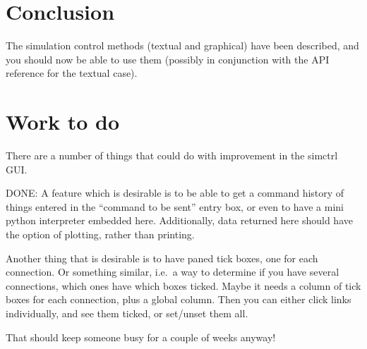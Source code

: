 \documentclass{article}
\begin{document}
\section{Conclusion}
The simulation control methods (textual and graphical) have been
described, and you should now be able to use them (possibly in
conjunction with the API reference for the textual case).

\section{Work to do}
There are a number of things that could do with improvement in the
simctrl GUI.

DONE: A feature which is desirable is to be able to get a command history of
things entered in the ``command to be sent'' entry box, or even to
have a mini python interpreter embedded here.  Additionally, data
returned here should have the option of plotting, rather than
printing.

Another thing that is desirable is to have paned tick boxes, one for
each connection.  Or something similar, i.e.\ a way to determine if
you have several connections, which ones have which boxes ticked.
Maybe it needs a column of tick boxes for each connection, plus a
global column.  Then you can either click links individually, and see
them ticked, or set/unset them all.


That should keep someone busy for a couple of weeks anyway!

\printindex
\end{document}
